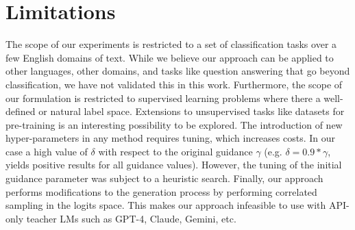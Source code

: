 \section{Limitations}
The scope of our experiments is restricted to a set of classification tasks over a few English domains of text. While we believe our approach can be applied to other languages, other domains, and tasks like question answering that go beyond classification, we have not validated this in this work. Furthermore, the scope of our formulation is restricted to supervised learning problems where there a well-defined or natural label space. Extensions to unsupervised tasks like datasets for pre-training is an interesting possibility to be explored. The introduction of new hyper-parameters in any method requires tuning, which increases costs. In our case a high value of $\delta$ with respect to the original guidance $\gamma$ (e.g. $\delta = 0.9*\gamma$, yields positive results for all guidance values). However, the tuning of the initial guidance parameter was subject to a heuristic search. Finally, our approach performs modifications to the generation process by performing correlated sampling in the logits space. This makes our approach infeasible to use with API-only teacher LMs such as GPT-4, Claude, Gemini, etc. 